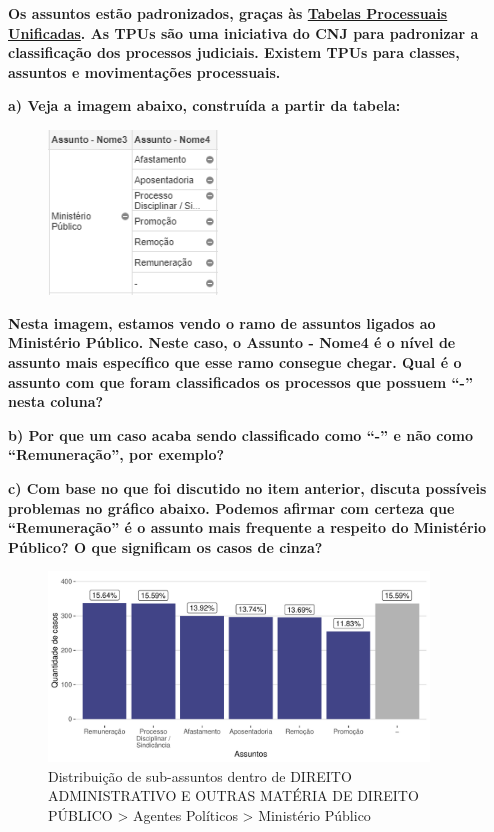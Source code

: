 \documentclass[
  letterpaper,
  DIV=11,
  numbers=noendperiod]{scrartcl}
\begin{document}
\textbf{Os assuntos estão padronizados, graças às
\href{https://www.cnj.jus.br/sgt/consulta_publica_assuntos.php}{Tabelas
Processuais Unificadas}. As TPUs são uma iniciativa do CNJ para
padronizar a classificação dos processos judiciais. Existem TPUs para
classes, assuntos e movimentações processuais.}

\textbf{a) Veja a imagem abaixo, construída a partir da tabela:}

\begin{figure}

{\centering \includegraphics[width=0.4\textwidth,height=\textheight]{img/assuntos.png}

}

\end{figure}

\textbf{Nesta imagem, estamos vendo o ramo de assuntos ligados ao
Ministério Público. Neste caso, o Assunto - Nome4 é o nível de assunto
mais específico que esse ramo consegue chegar. Qual é o assunto com que
foram classificados os processos que possuem ``-'' nesta coluna?}

\textbf{b) Por que um caso acaba sendo classificado como ``-'' e não
como ``Remuneração'', por exemplo?}

\textbf{c) Com base no que foi discutido no item anterior, discuta
possíveis problemas no gráfico abaixo. Podemos afirmar com certeza que
``Remuneração'' é o assunto mais frequente a respeito do Ministério
Público? O que significam os casos de cinza?}

\begin{figure}

{\centering \includegraphics[width=0.9\textwidth,height=\textheight]{e_pgd_files/figure-pdf/fig-assuntos-mp-1.pdf}

}

\caption{\label{fig-assuntos-mp}Distribuição de sub-assuntos dentro de
DIREITO ADMINISTRATIVO E OUTRAS MATÉRIA DE DIREITO PÚBLICO
\textgreater{} Agentes Políticos \textgreater{} Ministério Público}

\end{figure}
\end{document}
